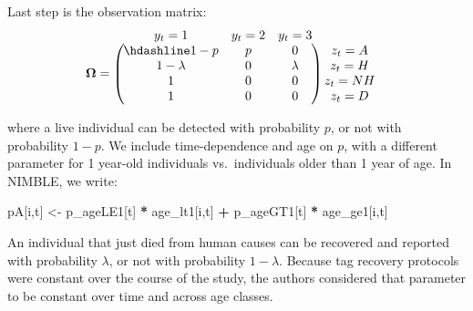 \documentclass[
  12pt,
]{krantz}
\newenvironment{Shaded}{\begin{snugshade}}{\end{snugshade}}
\newcommand{\NormalTok}[1]{#1}
\newcommand{\OtherTok}[1]{\textcolor[rgb]{0.56,0.35,0.01}{#1}}
\newcommand{\SpecialCharTok}[1]{\textcolor[rgb]{0.81,0.36,0.00}{\textbf{#1}}}
\begin{document}
Last step is the observation matrix:
\[\begin{matrix}
& \\
\mathbf{\Omega} =
\left ( \vphantom{ \begin{matrix} 12 \\ 12 \\ 12 \\ 12 \end{matrix} } \right .
\end{matrix}
\hspace{-1.2em}
\begin{matrix}
y_t=1 & y_t=2 & y_t=3\\ \hdashline
1 - p & p & 0 \\
1 - \lambda & 0 & \lambda\\
1 & 0 & 0\\
1 & 0 & 0
\end{matrix}
\hspace{-0.2em}
\begin{matrix}
& \\
\left . \vphantom{ \begin{matrix} 12 \\ 12 \\ 12 \\ 12 \end{matrix} } \right )
\begin{matrix}
z_{t}=A \\ z_{t}=H \\ z_{t}=NH \\ z_{t}=D
\end{matrix}
\end{matrix}\]

where a live individual can be detected with probability \(p\), or not with probability \(1−p\). We include time-dependence and age on \(p\), with a different parameter for 1 year-old individuals vs.~individuals older than 1 year of age. In NIMBLE, we write:

\begin{Shaded}
\begin{Highlighting}[]
\NormalTok{pA[i,t] }\OtherTok{\textless{}{-}}\NormalTok{ p\_ageLE1[t] }\SpecialCharTok{*}\NormalTok{ age\_lt1[i,t] }\SpecialCharTok{+}\NormalTok{ p\_ageGT1[t] }\SpecialCharTok{*}\NormalTok{ age\_ge1[i,t]}
\end{Highlighting}
\end{Shaded}

An individual that just died from human causes can be recovered and reported with probability \(\lambda\), or not with probability \(1-\lambda\). Because tag recovery protocols were constant over the course of the study, the authors considered that parameter to be constant over time and across age classes.
\end{document}
